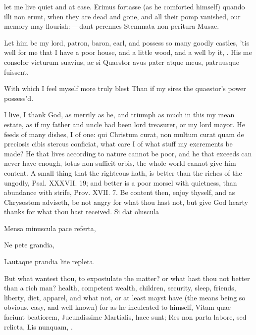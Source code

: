 {let me live quiet and at ease. Erimus fortasse (as he comforted
himself) quando illi non erunt, when they are dead and gone, and all
their pomp vanished, our memory may flourish:
---dant perennes
Stemmata non peritura Musae.

Let him be my lord, patron, baron, earl, and possess so many goodly
castles, 'tis well for me that I have a poor house, and a little
wood, and a well by it, \etc{}.
His me consolor victurum suavius, ac si
Quaestor avus pater atque meus, patruusque fuissent.

With which I feel myself more truly blest
Than if my sires the quaestor's power possess'd.

I live, I thank God, as merrily as he, and triumph as much in this my
mean estate, as if my father and uncle had been lord treasurer, or my
lord mayor. He feeds of many dishes, I of one: qui Christum
curat, non multum curat quam de preciosis cibis stercus conficiat, what
care I of what stuff my excrements be made? He that lives
according to nature cannot be poor, and he that exceeds can never have
enough, totus non sufficit orbis, the whole world cannot give him
content. A small thing that the righteous hath, is better than the
riches of the ungodly, Psal. XXXVII. 19; and better is a poor morsel
with quietness, than abundance with strife, Prov. XVII. 7. Be content
then, enjoy thyself, and as  Chrysostom adviseth, be not angry
for what thou hast not, but give God hearty thanks for what thou hast
received.
Si dat oluscula

Mensa minuscula
pace referta,

Ne pete grandia,

Lautaque prandia
lite repleta.

But what wantest thou, to expostulate the matter? or what hast thou not
better than a rich man? health, competent wealth, children,
security, sleep, friends, liberty, diet, apparel, and what not, or at
least mayst have (the means being so obvious, easy, and well known) for
as he inculcated to himself,
Vitam quae faciunt beatiorem,
Jucundissime Martialis, haec sunt;
Res non parta labore, sed relicta,
Lis nunquam, \etc{}.

}
